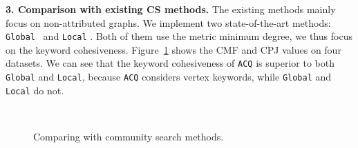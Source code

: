 {\bf 3. Comparison with existing CS methods.}
The existing methods mainly focus on non-attributed graphs. We implement two state-of-the-art methods:
{\tt Global}~\cite{KDD2010} and {\tt Local} \cite{local2014}. Both of them use the metric minimum degree, we thus focus on the keyword cohesiveness. Figure~\ref{fig:search-comp} shows the CMF and CPJ values on four datasets. We can see that the keyword cohesiveness of {\tt ACQ} is superior to both {\tt Global} and {\tt Local}, because {\tt ACQ} considers vertex keywords, while {\tt Global} and {\tt Local} do not.

\begin{figure}[ht]
    \centering
    \mbox{
        \hspace{2ex}
    }
    \caption{Comparing with community search methods.}
    \label{fig:search-comp}
\end{figure}

